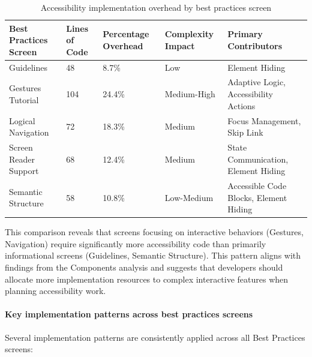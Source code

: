 \begin{table}[ht]
\caption{Accessibility implementation overhead by best practices screen}
\label{tab:best_practices_comparative_overhead}
\centering
\begin{tabular}[c]{|P{2.5cm}|P{2cm}|P{2.8cm}|P{2.8cm}|P{4.5cm}|}
\hline
\textbf{Best Practices Screen} & \textbf{Lines of Code} & \textbf{Percentage Overhead} & \textbf{Complexity Impact} & \textbf{Primary Contributors} \\
\hline
Guidelines & 48 & 8.7\% & Low & Element Hiding \\
\hline
Gestures Tutorial & 104 & 24.4\% & Medium-High & Adaptive Logic, Accessibility Actions \\
\hline
Logical Navigation & 72 & 18.3\% & Medium & Focus Management, Skip Link \\
\hline
Screen Reader Support & 68 & 12.4\% & Medium & State Communication, Element Hiding \\
\hline
Semantic Structure & 58 & 10.8\% & Low-Medium & Accessible Code Blocks, Element Hiding \\
\hline
\end{tabular}
\end{table}

This comparison reveals that screens focusing on interactive behaviors (Gestures, Navigation) require significantly more accessibility code than primarily informational screens (Guidelines, Semantic Structure). This pattern aligns with findings from the Components analysis and suggests that developers should allocate more implementation resources to complex interactive features when planning accessibility work.

\paragraph{Key implementation patterns across best practices screens}

Several implementation patterns are consistently applied across all Best Practices screens:

